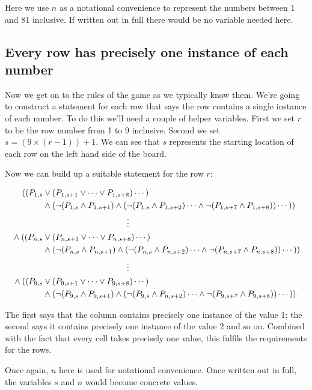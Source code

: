 \documentclass[10pt]{article}
\begin{document}
Here we use $n$ as a notational convenience to represent the numbers between 1 and 81 inclusive. If written out in full there would be no variable needed here.

\subsection{Every row has precisely one instance of each number}

Now we get on to the rules of the game as we typically know them. We're going to construct a statement for each row that says the row contains a single instance of each number. To do this we'll need a couple of helper variables. First we set $r$ to be the row number from 1 to 9 inclusive. Second we set $s = (9 \times (r - 1)) + 1$. We can see that $s$ represents the starting location of each row on the left hand side of the board.

Now we can build up a suitable statement for the row $r$:

\begin{align*}
((P_{1, s} & \lor (P_{1, s + 1} \lor \cdots \lor P_{1, s + 8}) \cdots ) \\
& \land (\lnot(P_{1, s} \land P_{1, s + 1}) \land (\lnot(P_{1, s} \land P_{1, s + 2}) \cdots \land \lnot(P_{1, s + 7} \land P_{1, s + 8})) \cdots )) \\
& \qquad \qquad \qquad \qquad \qquad \vdots \\
{} \land ((P_{n, s} & \lor (P_{n, s + 1} \lor \cdots \lor P_{n, s + 8}) \cdots ) \\
& \land (\lnot(P_{n, s} \land P_{n, s + 1}) \land (\lnot(P_{n, s} \land P_{n, s + 2}) \cdots \land \lnot(P_{n, s + 7} \land P_{n, s + 8})) \cdots )) \\
& \qquad \qquad \qquad \qquad \qquad \vdots \\
{} \land ((P_{9, s} & \lor (P_{9,s + 1} \lor \cdots \lor P_{9, s + 8}) \cdots ) \\
& \land (\lnot(P_{9, s} \land P_{9, s + 1}) \land (\lnot(P_{9, s} \land P_{n, s + 2}) \cdots \land \lnot(P_{9, s + 7} \land P_{9, s + 8})) \cdots )) .
\end{align*}

The first says that the column contains precisely one instance of the value 1; the second says it contains precisely one instance of the value 2 and so on. Combined with the fact that every cell takes precisely one value, this fulfils the requirements for the rows.

Once again, $n$ here is used for notational convenience. Once written out in full, the variables $s$ and $n$ would become concrete values.
\end{document}
